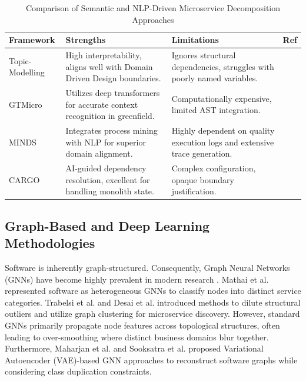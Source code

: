 \documentclass[12pt, a4paper]{article}
\begin{document}
\begin{table}[htbp]
\centering
\caption{Comparison of Semantic and NLP-Driven Microservice Decomposition Approaches}
\label{tab:semantic_comp}
\begin{tabularx}{\textwidth}{@{}l >{\raggedright\arraybackslash}X >{\raggedright\arraybackslash}X c@{}}
\toprule
\textbf{Framework} & \textbf{Strengths} & \textbf{Limitations} & \textbf{Ref} \\
\midrule
Topic-Modelling & High interpretability, aligns well with Domain Driven Design boundaries. & Ignores structural dependencies, struggles with poorly named variables. & \cite{brito2021} \\
GTMicro & Utilizes deep transformers for accurate context recognition in greenfield. & Computationally expensive, limited AST integration. & \cite{bajaj2024} \\
MINDS & Integrates process mining with NLP for superior domain alignment. & Highly dependent on quality execution logs and extensive trace generation. & \cite{aitmansour2025minds} \\
CARGO & AI-guided dependency resolution, excellent for handling monolith state. & Complex configuration, opaque boundary justification. & \cite{nitin2023} \\
\bottomrule
\end{tabularx}
\end{table}

\subsection{Graph-Based and Deep Learning Methodologies}
Software is inherently graph-structured. Consequently, Graph Neural Networks (GNNs) have become highly prevalent in modern research \cite{nguyen2022}. Mathai et al. \cite{mathai2022} represented software as heterogeneous GNNs to classify nodes into distinct service categories. Trabelsi et al. \cite{trabelsi2024} and Desai et al. \cite{desai2021} introduced methods to dilute structural outliers and utilize graph clustering for microservice discovery. However, standard GNNs primarily propagate node features across topological structures, often leading to over-smoothing where distinct business domains blur together. Furthermore, Maharjan et al. \cite{maharjan2025} and Sooksatra et al. \cite{sooksatra2022} proposed Variational Autoencoder (VAE)-based GNN approaches to reconstruct software graphs while considering class duplication constraints.
\end{document}
